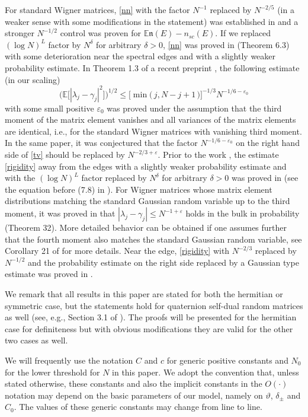 \documentclass[draft]{article}
\newcommand{\ttau}{\vartheta}
\newcommand{\fn}{{\mathfrak n}}
\newcommand{\e}{\varepsilon}
\newcommand{\be}{\begin{equation}}
\newcommand{\ee}{\end{equation}}
\newcommand{\E}{{\mathbb E }}
\numberwithin{equation}{section}
\numberwithin{theorem}{section}
\numberwithin{definition}{section}
\numberwithin{remark}{section}
\begin{document}
For standard Wigner matrices, \eqref{nn} with the factor $N^{-1}$ replaced by  $N^{-2/5}$
 (in a weaker sense with some modifications in the statement)  was established in \cite{BMT}
and  a  stronger $N^{-1/2}$ control was proven for $\E \fn (E)-n_{sc}(E)$.
 If we replaced $(\log N)^{L }$ factor by $N^\delta$ for arbitrary $\delta>0$, 
\eqref{nn} was proved in \cite{EYY2} (Theorem 6.3)  with some deterioration near the 
spectral edges 
and with a slightly weaker probability estimate. 
In Theorem 1.3 of a recent preprint \cite{TV4}, the following estimate (in our scaling)
\be\label{tv}
\Big (\E \big[  |\lambda_j-\gamma_j|^2 \big] \Big )^{1/2} \le 
\Big [ \min \big ( \, j ,  N-j+1 \,  \big) \Big  ]^{-1/3}   N^{-1/6 - \e_0}
\ee
with some small positive $\e_0$ 
was  proved under the assumption that the third moment of the matrix element vanishes and all variances 
of the matrix elements are identical, i.e., for the standard Wigner matrices 
with vanishing third moment.
In the same paper, it was conjectured that the factor $N^{-1/6 - \e_0}$ on 
the right hand side of \eqref{tv} should be replaced by $N^{-2/3 + \e}$. 
Prior to the work \cite{TV4}, the estimate \eqref{rigidity} 
away from the edges with a slightly weaker probability estimate 
and with the $(\log N)^{L}$ factor replaced by $N^\delta$ for arbitrary $\delta>0$
was proved in \cite{EYY2} (see the equation before (7.8) in \cite{EYY2}).  
For Wigner matrices whose matrix element distributions matching the 
standard Gaussian random variable  
up to the third  moment, it was proved in \cite{TV} that 
$ |\lambda_j-\gamma_j| \le N^{-1 + \e}$ holds in the bulk in  probability
(Theorem 32). More detailed behavior can be obtained if one assumes 
further that the fourth moment also matches  
the standard Gaussian random variable, see Corollary 21 of \cite{TV}
 for more details. Near the  edge,  \eqref{rigidity}
with  $N^{-2/3}$  replaced by $N^{-1/2}$ and  the probability estimate on the right side 
replaced by a Gaussian type estimate
was proved in \cite{Alon}. 




We remark that all results in this paper are stated for both the hermitian or symmetric case, but
the statements hold for quaternion self-dual random matrices as well
(see, e.g., Section 3.1 of \cite{ESYY}). The proofs will be
presented for the hermitian case for definiteness
but with obvious modifications
they are valid for the other two cases as well.


We will frequently use the notation $C$ and $c$
for generic positive constants and $N_0$ for the lower threshold for $N$
in this paper. We adopt the convention that, unless stated otherwise,
 these constants
and also the implicit constants in the  $O(\cdot)$ notation
may depend on the basic parameters of our model, namely on $\ttau$,
$\delta_\pm$ and $C_0$. The values of these generic constants may
change from line to line.
\end{document}
